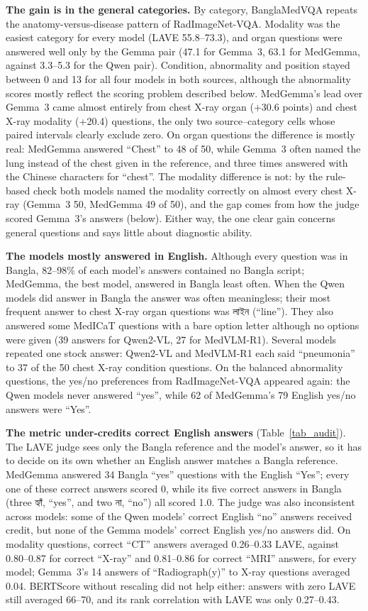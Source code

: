 \documentclass[doublecolumn]{ijcvsplatex}
\newcommand{\bn}[1]{{\bengalifont #1}}
\newcommand{\bn}[1]{\textit{[Bangla]}}
\newcommand{\qwen}{Qwen2-VL}
\newcommand{\medvlm}{MedVLM-R1}
\newcommand{\gemma}{Gemma~3}
\newcommand{\medgemma}{MedGemma}
\begin{document}
\textbf{The gain is in the general categories.} By category, BanglaMedVQA repeats the anatomy-versus-disease pattern of RadImageNet-VQA. Modality was the easiest category for every model (LAVE 55.8--73.3), and organ questions were answered well only by the Gemma pair (47.1 for \gemma{}, 63.1 for \medgemma{}, against 3.3--5.3 for the Qwen pair). Condition, abnormality and position stayed between 0 and 13 for all four models in both sources, although the abnormality scores mostly reflect the scoring problem described below. \medgemma{}'s lead over \gemma{} came almost entirely from chest X-ray organ (+30.6 points) and chest X-ray modality (+20.4) questions, the only two source--category cells whose paired intervals clearly exclude zero. On organ questions the difference is mostly real: \medgemma{} answered ``Chest'' to 48 of 50, while \gemma{} often named the lung instead of the chest given in the reference, and three times answered with the Chinese characters for ``chest''. The modality difference is not: by the rule-based check both models named the modality correctly on almost every chest X-ray (\gemma{} 50, \medgemma{} 49 of 50), and the gap comes from how the judge scored \gemma{}'s answers (below). Either way, the one clear gain concerns general questions and says little about diagnostic ability.


\textbf{The models mostly answered in English.} Although every question was in Bangla, 82--98\% of each model's answers contained no Bangla script; \medgemma{}, the best model, answered in Bangla least often. When the Qwen models did answer in Bangla the answer was often meaningless; their most frequent answer to chest X-ray organ questions was \bn{লাইন} (``line''). They also answered some MedICaT questions with a bare option letter although no options were given (39 answers for \qwen{}, 27 for \medvlm{}). Several models repeated one stock answer: \qwen{} and \medvlm{} each said ``pneumonia'' to 37 of the 50 chest X-ray condition questions. On the balanced abnormality questions, the yes/no preferences from RadImageNet-VQA appeared again: the Qwen models never answered ``yes'', while 62 of \medgemma{}'s 79 English yes/no answers were ``Yes''.

\textbf{The metric under-credits correct English answers} (Table~\ref{tab_audit}). The LAVE judge sees only the Bangla reference and the model's answer, so it has to decide on its own whether an English answer matches a Bangla reference. \medgemma{} answered 34 Bangla ``yes'' questions with the English ``Yes''; every one of these correct answers scored 0, while its five correct answers in Bangla (three \bn{হ্যাঁ}, ``yes'', and two \bn{না}, ``no'') all scored 1.0. The judge was also inconsistent across models: some of the Qwen models' correct English ``no'' answers received credit, but none of the Gemma models' correct English yes/no answers did. On modality questions, correct ``CT'' answers averaged 0.26--0.33 LAVE, against 0.80--0.87 for correct ``X-ray'' and 0.81--0.86 for correct ``MRI'' answers, for every model; \gemma{}'s 14 answers of ``Radiograph(y)'' to X-ray questions averaged 0.04. BERTScore without rescaling did not help either: answers with zero LAVE still averaged 66--70, and its rank correlation with LAVE was only 0.27--0.43.
\end{document}
